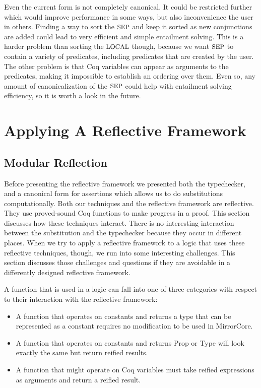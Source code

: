 \documentclass{puthesis}
\begin{document}
Even the current form is not completely canonical. It could be
restricted further which would improve performance in some ways, but
also inconvenience the user in others. Finding a way to sort the
$\mbox{\small SEP}$ and keep it sorted as new conjunctions are added could lead to
very efficient and simple entailment solving. This is a harder problem
than sorting the $\mbox{\small LOCAL}$ though, because we want $\mbox{\small SEP}$ to contain a
variety of predicates, including predicates that are created by the
user. The other problem is that Coq variables can appear as arguments
to the predicates, making it impossible to establish an ordering over
them. Even so, any amount of canonicalization of the $\mbox{\small SEP}$ could help
with entailment solving efficiency, so it is worth a look in the future. 

\chapter{Applying A Reflective Framework}

\section{Modular Reflection}

Before presenting the reflective framework we presented both the typechecker,
and a canonical form for assertions which allows us to do substitutions computationally.
Both our techniques and the reflective framework are reflective.
They use proved-sound Coq functions to make progress in a proof. This
section discusses how these techniques interact. There
is no interesting interaction between the substitution and the
typechecker because they occur in different places. When we try
to apply a reflective framework to a logic that uses these reflective
techniques, though, we run into some interesting challenges. This
section discusses those challenges and questions if they are 
avoidable in a differently designed reflective framework.

A function that is used in a logic can fall into one of
three categories with respect to their interaction
with the reflective framework:

\begin{itemize}
  \item A function that operates on constants and returns a type that can be represented as a constant
    requires no modification to be used in MirrorCore.
  \item A function that operates on constants and returns Prop or Type will look exactly
    the same but return reified results.
  \item A function that might operate on Coq variables must take reified expressions as 
    arguments and return a reified result.
\end{itemize}
\end{document}
